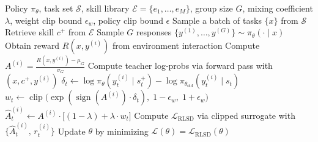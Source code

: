 \begin{algorithm}[t]
  \caption{RLSD}
  \label{alg:rlsd}
  \begin{algorithmic}[1]
  \Require Policy $\pi_{\theta}$, task set $\mathcal{S}$, skill library $\mathcal{E} =
  \{e_1,\dots,e_M\}$, group size $G$, mixing coefficient $\lambda$, weight clip
  bound $\epsilon_w$, policy clip bound $\epsilon$
      \State Sample a batch of tasks $\{x\}$ from $\mathcal{S}$
          \State Retrieve skill $c^{+}$ from $\mathcal{E}$ 
          \State {}
          \State Sample $G$ responses $\{y^{(1)},\dots,y^{(G)}\} \sim \pi_{\theta}(\cdot \mid
  x)$
          \State {}
              \State Obtain reward $R(x, y^{(i)})$ from environment interaction
          \EndFor
          \State Compute $A^{(i)} = \frac{R(x,y^{(i)}) - \mu_G}{\sigma_G}$
          \State {}
              \State Compute teacher log-probs via forward pass with $(x, c^{+}, y^{(i)})$
                  \State $\delta_t \gets \log\pi_{\theta}(y_t^{(i)} \mid s_t^{+}) -
  \log\pi_{\theta_{\mathrm{old}}}(y_t^{(i)} \mid s_t)$
                  \State $w_t \gets \operatorname{clip}\!\bigl(\exp(\operatorname{sign}(A^{(i)})
  \cdot \delta_t),\;1{-}\epsilon_w,\;1{+}\epsilon_w\bigr)$
                  \State $\hat{A}_t^{(i)} \gets A^{(i)} \cdot
  \bigl[(1-\lambda) + \lambda \cdot w_t\bigr]$
              \EndFor
          \EndFor
          \State {}
          \State Compute $\mathcal{L}_{\mathrm{RLSD}}$ via clipped surrogate with
  $\{\hat{A}_t^{(i)},\, r_t^{(i)}\}$
          \State {}
          \State Update $\theta$ by minimizing $\mathcal{L}(\theta) =
  \mathcal{L}_{\mathrm{RLSD}}(\theta)$
      \EndFor
  \EndFor
  \end{algorithmic}
\end{algorithm}